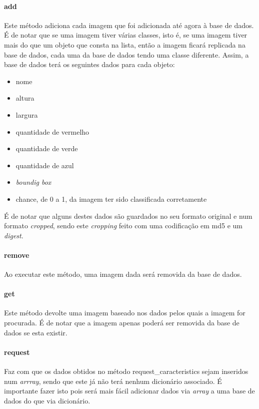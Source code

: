 \documentclass{report}
\begin{document}
\paragraph{add}
Este método adiciona cada imagem que foi adicionada até agora à base de dados. É de notar que se uma imagem tiver várias classes, isto é, se uma imagem tiver mais do que um objeto que consta na lista, então a imagem ficará replicada na base de dados, cada uma da base de dados tendo uma classe diferente. Assim, a base de dados terá os seguintes dados para cada objeto:
\begin{itemize}
\item nome
\item altura
\item largura
\item quantidade de vermelho
\item quantidade de verde
\item quantidade de azul
\item \textit{boundig box}
\item chance, de 0 a 1, da imagem ter sido classificada corretamente
\end{itemize}
É de notar que alguns destes dados são guardados no seu formato original e num formato \textit{cropped}, sendo este \textit{cropping} feito com uma codificação em md5 e um \textit{digest}.

\paragraph{remove}
Ao executar este método, uma imagem dada será removida da base de dados.

\paragraph{get}
Este método devolte uma imagem baseado nos dados pelos quais a imagem for procurada. É de notar que a imagem apenas poderá ser removida da base de dados se esta existir.

\paragraph{request}
Faz com que os dados obtidos no método request\_caracteristics sejam inseridos num \textit{arrray}, sendo que este já não terá nenhum dicionário associado. É importante fazer isto pois será mais fácil adicionar dados via \textit{array} a uma base de dados do que via dicionário.
\end{document}
